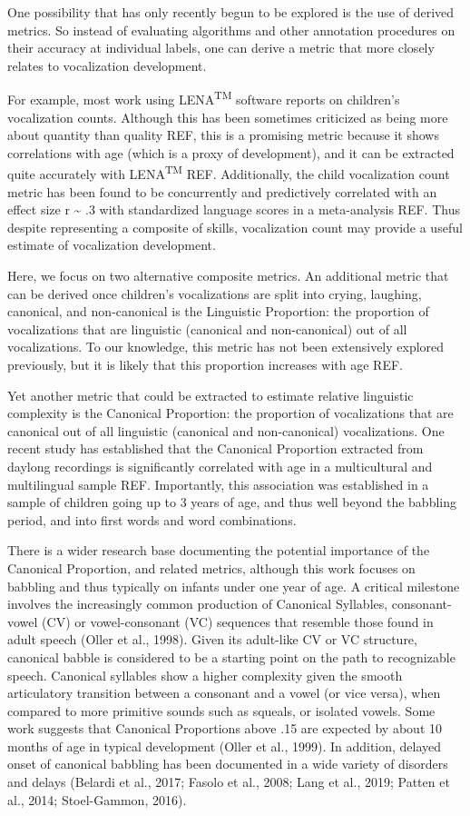 \documentclass[english,,man,floatsintext]{apa6}
\begin{document}
One possibility that has only recently begun to be explored is the use of derived metrics. So instead of evaluating algorithms and other annotation procedures on their accuracy at individual labels, one can derive a metric that more closely relates to vocalization development.

For example, most work using LENA\textsuperscript{TM} software reports on children's vocalization counts. Although this has been sometimes criticized as being more about quantity than quality REF, this is a promising metric because it shows correlations with age (which is a proxy of development), and it can be extracted quite accurately with LENA\textsuperscript{TM} REF. Additionally, the child vocalization count metric has been found to be concurrently and predictively correlated with an effect size r \textasciitilde{} .3 with standardized language scores in a meta-analysis REF. Thus despite representing a composite of skills, vocalization count may provide a useful estimate of vocalization development.

Here, we focus on two alternative composite metrics. An additional metric that can be derived once children's vocalizations are split into crying, laughing, canonical, and non-canonical is the Linguistic Proportion: the proportion of vocalizations that are linguistic (canonical and non-canonical) out of all vocalizations. To our knowledge, this metric has not been extensively explored previously, but it is likely that this proportion increases with age REF.

Yet another metric that could be extracted to estimate relative linguistic complexity is the Canonical Proportion: the proportion of vocalizations that are canonical out of all linguistic (canonical and non-canonical) vocalizations. One recent study has established that the Canonical Proportion extracted from daylong recordings is significantly correlated with age in a multicultural and multilingual sample REF. Importantly, this association was established in a sample of children going up to 3 years of age, and thus well beyond the babbling period, and into first words and word combinations.

There is a wider research base documenting the potential importance of the Canonical Proportion, and related metrics, although this work focuses on babbling and thus typically on infants under one year of age. A critical milestone involves the increasingly common production of Canonical Syllables, consonant-vowel (CV) or vowel-consonant (VC) sequences that resemble those found in adult speech (Oller et al., 1998). Given its adult-like CV or VC structure, canonical babble is considered to be a starting point on the path to recognizable speech. Canonical syllables show a higher complexity given the smooth articulatory transition between a consonant and a vowel (or vice versa), when compared to more primitive sounds such as squeals, or isolated vowels. Some work suggests that Canonical Proportions above .15 are expected by about 10 months of age in typical development (Oller et al., 1999). In addition, delayed onset of canonical babbling has been documented in a wide variety of disorders and delays (Belardi et al., 2017; Fasolo et al., 2008; Lang et al., 2019; Patten et al., 2014; Stoel-Gammon, 2016).
\end{document}

